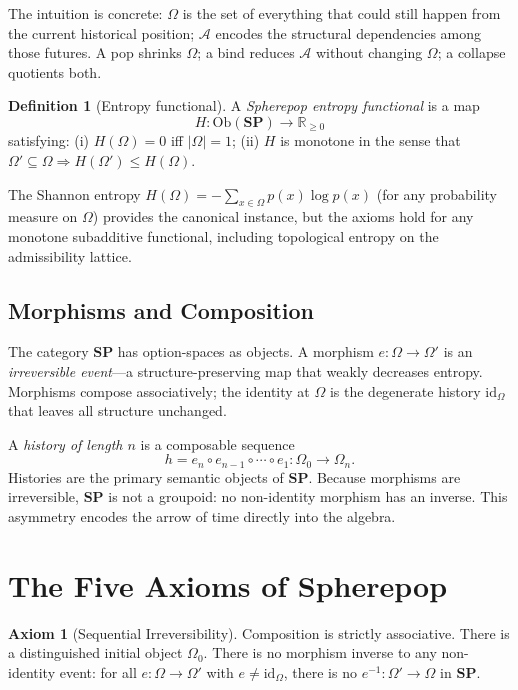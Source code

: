 \documentclass[12pt, a4paper]{article}
\theoremstyle{definition}
\newtheorem{definition}[theorem]{Definition}
\newtheorem{axiom}{Axiom}
\theoremstyle{remark}
\newcommand{\Ent}{H}
\newcommand{\Rnn}{\mathbb{R}_{\ge 0}}
\newcommand{\SP}{\mathbf{SP}}
\newcommand{\id}{\mathrm{id}}
\newcommand{\Ob}{\mathrm{Ob}}
\begin{document}
The intuition is concrete: $\Omega$ is the set of everything that could still happen
from the current historical position; $\mathcal{A}$ encodes the structural dependencies
among those futures. A pop shrinks $\Omega$; a bind reduces $\mathcal{A}$ without
changing $\Omega$; a collapse quotients both.

\begin{definition}[Entropy functional]
A \emph{Spherepop entropy functional} is a map
\[
  \Ent : \Ob(\SP) \longrightarrow \Rnn
\]
satisfying: (i) $\Ent(\Omega) = 0$ iff $|\Omega| = 1$; (ii) $\Ent$ is monotone in the
sense that $\Omega' \subseteq \Omega \Rightarrow \Ent(\Omega') \le \Ent(\Omega)$.
\end{definition}

The Shannon entropy $\Ent(\Omega) = -\sum_{x \in \Omega} p(x) \log p(x)$ (for any
probability measure on $\Omega$) provides the canonical instance, but the axioms hold
for any monotone subadditive functional, including topological entropy on the
admissibility lattice.

\subsection{Morphisms and Composition}

The category $\SP$ has option-spaces as objects. A morphism $e : \Omega \to \Omega'$
is an \emph{irreversible event}—a structure-preserving map that weakly decreases
entropy. Morphisms compose associatively; the identity at $\Omega$ is the degenerate
history $\id_\Omega$ that leaves all structure unchanged.

A \emph{history of length $n$} is a composable sequence
\[
  h = e_n \circ e_{n-1} \circ \cdots \circ e_1 : \Omega_0 \longrightarrow \Omega_n.
\]
Histories are the primary semantic objects of $\SP$. Because morphisms are
irreversible, $\SP$ is not a groupoid: no non-identity morphism has an inverse. This
asymmetry encodes the arrow of time directly into the algebra.

\section{The Five Axioms of Spherepop}
\label{sec:axioms}

\begin{axiom}[Sequential Irreversibility]
\label{ax:seq}
Composition is strictly associative. There is a distinguished initial object $\Omega_0$.
There is no morphism inverse to any non-identity event: for all $e : \Omega \to \Omega'$
with $e \ne \id_\Omega$, there is no $e^{-1} : \Omega' \to \Omega$ in $\SP$.
\end{axiom}
\end{document}

